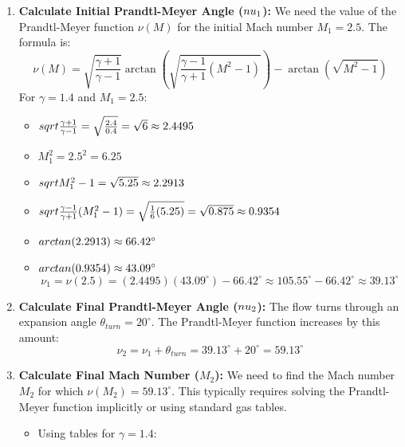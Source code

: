 \begin{enumerate}
\def\labelenumi{\arabic{enumi}.}
\item
  \textbf{Calculate Initial Prandtl-Meyer Angle (\(\\nu_1\)):} We need
  the value of the Prandtl-Meyer function \(\nu(M)\) for the initial
  Mach number \(M_1 = 2.5\). The formula is:
  \[ \nu(M) = \sqrt{\frac{\gamma+1}{\gamma-1}} \arctan\left( \sqrt{\frac{\gamma-1}{\gamma+1}(M^2-1)} \right) - \arctan\left( \sqrt{M^2-1} \right) \]
  For \(\gamma = 1.4\) and \(M_1 = 2.5\):

  \begin{itemize}
  \tightlist
  \item
    \(\\sqrt{\frac{\gamma+1}{\gamma-1}} = \sqrt{\frac{2.4}{0.4}} = \sqrt{6} \approx 2.4495\)
  \item
    \(M_1^2 = 2.5^2 = 6.25\)
  \item
    \(\\sqrt{M_1^2-1} = \sqrt{5.25} \approx 2.2913\)
  \item
    \(\\sqrt{\frac{\gamma-1}{\gamma+1}(M_1^2-1)} = \sqrt{\frac{1}{6}(5.25)} = \sqrt{0.875} \approx 0.9354\)
  \item
    \(\\arctan(2.2913) \approx 66.42^\circ\)
  \item
    \(\\arctan(0.9354) \approx 43.09^\circ\)
    \[ \nu_1 = \nu(2.5) = (2.4495)(43.09^\circ) - 66.42^\circ \approx 105.55^\circ - 66.42^\circ \approx 39.13^\circ \]
  \end{itemize}
\item
  \textbf{Calculate Final Prandtl-Meyer Angle (\(\\nu_2\)):} The flow
  turns through an expansion angle \(\theta_{turn} = 20^\circ\). The
  Prandtl-Meyer function increases by this amount:
  \[ \nu_2 = \nu_1 + \theta_{turn} = 39.13^\circ + 20^\circ = 59.13^\circ \]
\item
  \textbf{Calculate Final Mach Number (\(M_2\)):} We need to find the
  Mach number \(M_2\) for which \(\nu(M_2) = 59.13^\circ\). This
  typically requires solving the Prandtl-Meyer function implicitly or
  using standard gas tables.

  \begin{itemize}
  \tightlist
  \item
    Using tables for \(\gamma=1.4\):


\end{itemize}
\end{enumerate}
